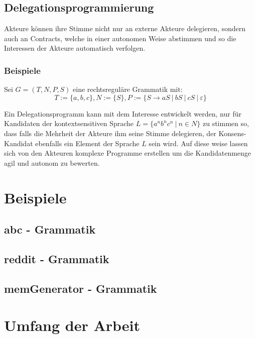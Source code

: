 \documentclass[]{article}
\begin{document}
\subsection{Delegationsprogrammierung}
Akteure können ihre Stimme nicht nur an externe Akteure delegieren, sondern auch an Contracts, welche in einer autonomen Weise abstimmen und so die Interessen der Akteure automatisch verfolgen. 

\subsubsection*{Beispiele}

Sei $G=(T,N,P,S)$ eine rechtsreguläre Grammatik mit:
\[ T:=\{ a, b, c \}, N:=\{S\}, P:= \{S\rightarrow aS\ |\ bS\ |\ cS\ |\ \varepsilon \} \] 

Ein Delegationsprogramm kann mit dem Interesse entwickelt werden, nur für Kandidaten der kontextsensitiven Sprache $L = \{ a^nb^nc^n\ |\ n\in N\}$ zu stimmen so, dass falls die Mehrheit der Akteure ihm seine Stimme delegieren, der Konsens-Kandidat ebenfalls ein Element der Sprache $L$ sein wird. Auf diese weise lassen sich von den Akteuren komplexe Programme erstellen um die Kandidatenmenge agil und autonom zu bewerten.

\section{ Beispiele }

\subsection*{ abc - Grammatik }
\subsection*{ reddit - Grammatik }
\subsection*{ memGenerator - Grammatik }




\section{Umfang der Arbeit}
\end{document}
